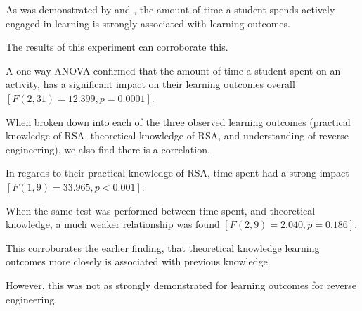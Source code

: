         







        As was demonstrated by \citeauthor{C-Linehan} and \citeauthor{Z-Zeng}, the amount of time a student spends actively engaged in learning is strongly associated with learning outcomes. %







The results of this experiment can corroborate this. %







A one-way ANOVA confirmed that the amount of time a student spent on an activity, has a significant impact on their learning outcomes overall $[F(2,31)=12.399, p=0.0001]$.







        







        When broken down into each of the three observed learning outcomes (practical knowledge of RSA, theoretical knowledge of RSA, and understanding of reverse engineering), we also find there is a correlation. %







In regards to their practical knowledge of RSA, time spent had a strong impact $[F(1,9)=33.965, p<0.001]$. %







When the same test was performed between time spent, and theoretical knowledge, a much weaker relationship was found $[F(2, 9)=2.040, p=0.186]$. %







This corroborates the earlier finding, that theoretical knowledge learning outcomes more closely is associated with previous knowledge. %







However, this was not as strongly demonstrated for learning outcomes for reverse engineering. %







